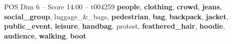 \begin{textsample}{POS Dim 6 – Score 14.00 – t004259}  \label{ex:f6_pos_040}
\textbf{people}, \textbf{clothing}, \textbf{crowd}, \textbf{jeans}, \textbf{social\_group}, luggage\_\&\_bags, \textbf{pedestrian}, \textbf{bag}, \textbf{backpack}, \textbf{jacket}, \textbf{public\_event}, \textbf{leisure}, \textbf{handbag}, protest, \textbf{feathered\_hair}, \textbf{hoodie}, \textbf{audience}, \textbf{walking}, \textbf{boot}

\end{textsample}
